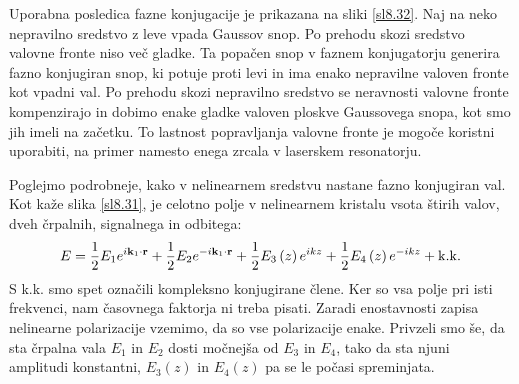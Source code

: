 Uporabna posledica fazne konjugacije je prikazana na sliki \ref{sl8.32}.
Naj na neko nepravilno sredstvo z leve vpada Gaussov snop. Po prehodu
skozi sredstvo valovne fronte niso več gladke. Ta popačen snop v faznem
konjugatorju generira fazno konjugiran snop, ki potuje proti levi
in ima enako nepravilne valoven fronte kot vpadni val. Po prehodu
skozi nepravilno sredstvo se neravnosti valovne fronte kompenzirajo
in dobimo enake gladke valoven ploskve Gaussovega snopa, kot smo
jih imeli na začetku. To lastnost popravljanja valovne fronte je mogoče
koristni uporabiti, na primer namesto enega zrcala v laserskem resonatorju.

Poglejmo podrobneje, kako v nelinearnem sredstvu nastane fazno konjugiran
val. Kot kaže slika \ref{sl8.31}, je celotno polje v nelinearnem
kristalu vsota štirih valov, dveh črpalnih, signalnega in odbitega:
\begin{equation}
E=\frac{1}{2}E_{1}e^{i{\bf k}_{1}\cdot{\bf r}}+\frac{1}{2}E_{2}e^{-i{\bf k}_{1}\cdot{\bf r}}+\frac{1}{2}E_{3}\left(z\right)e^{ikz}+\frac{1}{2}E_{4}\left(z\right)e^{-ikz}+{\rm k.k.}\label{8.99}
\end{equation}
 S k.k. smo spet označili kompleksno konjugirane člene. Ker so vsa
polje pri isti frekvenci, nam časovnega faktorja ni treba pisati.
Zaradi enostavnosti zapisa nelinearne polarizacije vzemimo, da so
vse polarizacije enake. Privzeli smo še, da sta črpalna vala $E_{1}$
in $E_{2}$ dosti močnejša od $E_{3}$ in $E_{4}$, tako da sta njuni
amplitudi konstantni, $E_{3}\left(z\right)$ in $E_{4}\left(z\right)$
pa se le počasi spreminjata.

